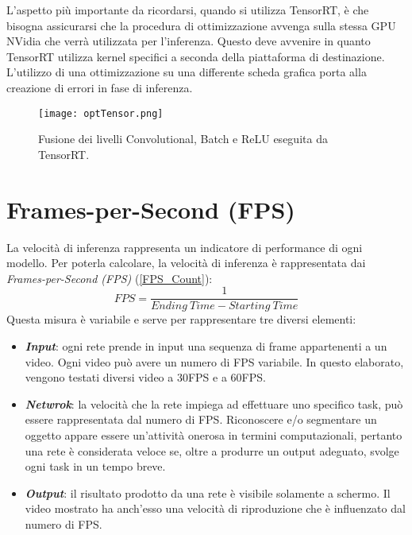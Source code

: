 L'aspetto più importante da ricordarsi, quando si utilizza TensorRT, è che 
bisogna assicurarsi che la procedura di ottimizzazione avvenga sulla stessa 
GPU NVidia che verrà utilizzata per l'inferenza. Questo deve avvenire 
in quanto TensorRT utilizza kernel specifici a seconda della piattaforma 
di destinazione. L'utilizzo di una ottimizzazione su una differente scheda 
grafica porta alla creazione di errori in fase di inferenza. 
\begin{figure}
    \centering
    \texttt{[image: optTensor.png]}
    \centering
    \caption{Fusione dei livelli Convolutional, Batch e ReLU eseguita da TensorRT.}
    \label{fusion_tensorrt}
\end{figure}



\section{Frames-per-Second (FPS)}
La velocità di inferenza rappresenta un indicatore di performance di ogni 
modello. Per poterla calcolare, la velocità di inferenza è rappresentata dai 
\emph{Frames-per-Second (FPS)} (\ref{FPS_Count}):
\begin{equation}\label{FPS_Count}
    FPS = \frac{1}{Ending \ Time - Starting \ Time}
\end{equation}
Questa misura è variabile e serve per rappresentare tre diversi elementi:
\begin{itemize}
    \item {\bfseries{\emph{Input}}}: ogni rete prende in input una sequenza di frame appartenenti 
    a un video. Ogni video può avere un numero di FPS variabile. In 
    questo elaborato, vengono testati diversi video a 30FPS e a 60FPS.
    \item {\bfseries{\emph{Netwrok}}}: la velocità che la rete impiega ad effettuare uno specifico 
    task, può essere rappresentata dal numero di FPS. Riconoscere e/o 
    segmentare un oggetto appare essere un'attività onerosa in termini 
    computazionali, pertanto una rete è considerata veloce se, oltre a 
    produrre un output adeguato, svolge ogni task in un tempo breve.
    \item {\bfseries{\emph{Output}}}: il risultato prodotto da una rete è visibile solamente a 
    schermo. Il video mostrato ha anch'esso una velocità di riproduzione 
    che è influenzato dal numero di FPS.
\end{itemize}